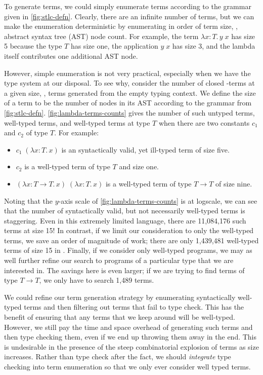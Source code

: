 To generate \stlc{} terms, we could simply enumerate terms according to the grammar given in \autoref{fig:stlc-defn}.
Clearly, there are an infinite number of terms, but we can make the enumeration deterministic by enumerating in order of term size, \ie, abstract syntax tree (AST) node count.
For example, the term $λx{:}T.\,y\;x$ has size 5 because the type $T$ has size one, the application $y\;x$ has size 3, and the lambda itself contributes one additional AST node.



However, simple enumeration is not very practical, especially when we have the type system at our disposal.
To see why, consider the number of closed \stlc-terms at a given size, \ie, terms generated from the empty typing context.
We define the size of a term to be the number of nodes in its AST according to the grammar from \autoref{fig:stlc-defn}.
\autoref{fig:lambda-terms-counts} gives the number of such untyped terms, well-typed terms, and well-typed terms at type $T$ when there are two constants $c_1$ and $c_2$ of type $T$.
For example:
\begin{itemize}
  \item $c_1\;(λx{:}T.\,x)$ is an syntactically valid, yet ill-typed term of size five.
  \item $c_2$ is a well-typed term of type $T$ and size one.
  \item $(λx{:}T → T.\,x)\;(λx{:}T.\,x)$ is a well-typed term of type $T → T$ of size nine.
\end{itemize}

Noting that the $y$-axis scale of \autoref{fig:lambda-terms-counts} is at logscale, we can see that the number of syntactically valid, but not necessarily well-typed terms is staggering.
Even in this extremely limited language, there are 11,084,176 such terms at size 15!
In contrast, if we limit our consideration to only the well-typed terms, we save an order of magnitude of work; there are only 1,439,481 well-typed terms of size 15 in \stlc.
Finally, if we consider only well-typed programs, we may as well further refine our search to programs of a particular type that we are interested in.
The savings here is even larger; if we are trying to find terms of type $T → T$, we only have to search 1,489 terms.

We could refine our term generation strategy by enumerating syntactically well-typed terms and then filtering out terms that fail to type check.
This has the benefit of ensuring that any terms that we keep around will be well-typed.
However, we still pay the time and space overhead of generating such terms and then type checking them, even if we end up throwing them away in the end.
This is undesirable in the presence of the steep combinatorial explosion of terms as size increases.
Rather than type check after the fact, we should \emph{integrate} type checking into term enumeration so that we only ever consider well typed terms.

